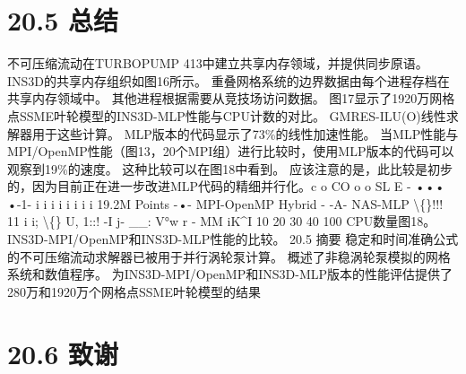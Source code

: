 \documentclass[UTF8,11pt,a4paper,openany,fontset=fandol]{ctexbook}
\begin{document}
\section{20.5 总结}
不可压缩流动在TURBOPUMP 413中建立共享内存领域，并提供同步原语。 INS3D的共享内存组织如图16所示。 重叠网格系统的边界数据由每个进程存档在共享内存领域中。 其他进程根据需要从竞技场访问数据。 图17显示了1920万网格点SSME叶轮模型的INS3D-MLP性能与CPU计数的对比。 GMRES-ILU(O)线性求解器用于这些计算。 MLP版本的代码显示了73\%的线性加速性能。 当MLP性能与MPI/OpenMP性能（图13，20个MPI组）进行比较时，使用MLP版本的代码可以观察到19\%的速度。 这种比较可以在图18中看到。 应该注意的是，此比较是初步的，因为目前正在进一步改进MLP代码的精细并行化。c o CO o o SL E - ••• •-1- i i i i i i i i 19.2M Points -•- MPI-OpenMP Hybrid - -A- NAS-MLP \textbackslash\{\}!!! 11 i i; \textbackslash\{\} U, 1::! -I j- \_\_: V°w r - MM iK\textasciicircum{}I 10 20 30 40 100 CPU数量图18。 INS3D-MPI/OpenMP和INS3D-MLP性能的比较。 20.5 摘要 稳定和时间准确公式的不可压缩流动求解器已被用于并行涡轮泵计算。 概述了非稳涡轮泵模拟的网格系统和数值程序。 为INS3D-MPI/OpenMP和INS3D-MLP版本的性能评估提供了280万和1920万个网格点SSME叶轮模型的结果

\section{20.6 致谢}
\end{document}
